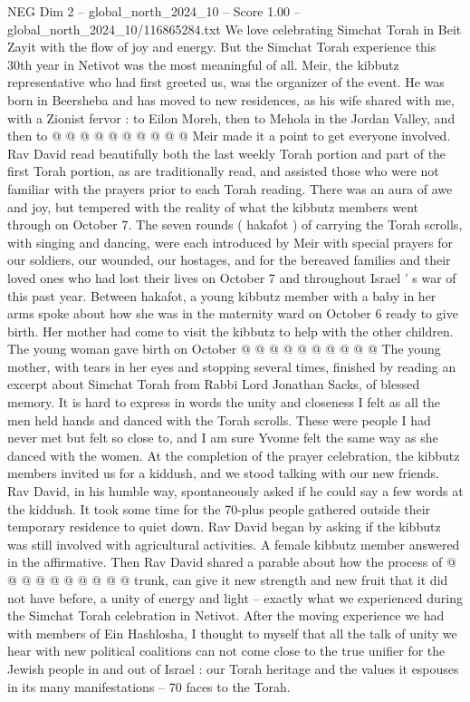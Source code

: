 \begin{textsample}{NEG Dim 2 – global\_north\_2024\_10 – Score 1.00 – global\_north\_2024\_10/116865284.txt}
We love celebrating Simchat Torah in Beit Zayit with the flow of joy and energy.
But the Simchat Torah experience this 30th year in Netivot was the most meaningful of all.
Meir, the kibbutz representative who had first greeted us, was the organizer of the event.
He was born in Beersheba and has moved to new residences, as his wife shared with me, with a Zionist fervor : to Eilon Moreh, then to Mehola in the Jordan Valley, and then to @ @ @ @ @ @ @ @ @ @ Meir made it a point to get everyone involved.
Rav David read beautifully both the last weekly Torah portion and part of the first Torah portion, as are traditionally read, and assisted those who were not familiar with the prayers prior to each Torah reading.
There was an aura of awe and joy, but tempered with the reality of what the kibbutz members went through on October 7.
The seven rounds ( hakafot ) of carrying the Torah scrolls, with singing and dancing, were each introduced by Meir with special prayers for our soldiers, our wounded, our hostages, and for the bereaved families and their loved ones who had lost their lives on October 7 and throughout Israel ' s war of this past year.
Between hakafot, a young kibbutz member with a baby in her arms spoke about how she was in the maternity ward on October 6 ready to give birth.
Her mother had come to visit the kibbutz to help with the other children.
The young woman gave birth on October @ @ @ @ @ @ @ @ @ @ The young mother, with tears in her eyes and stopping several times, finished by reading an excerpt about Simchat Torah from Rabbi Lord Jonathan Sacks, of blessed memory.
It is hard to express in words the unity and closeness I felt as all the men held hands and danced with the Torah scrolls.
These were people I had never met but felt so close to, and I am sure Yvonne felt the same way as she danced with the women.
At the completion of the prayer celebration, the kibbutz members invited us for a kiddush, and we stood talking with our new friends.
Rav David, in his humble way, spontaneously asked if he could say a few words at the kiddush.
It took some time for the 70-plus people gathered outside their temporary residence to quiet down.
Rav David began by asking if the kibbutz was still involved with agricultural activities.
A female kibbutz member answered in the affirmative.
Then Rav David shared a parable about how the process of @ @ @ @ @ @ @ @ @ @ trunk, can give it new strength and new fruit that it did not have before, a unity of energy and light -- exactly what we experienced during the Simchat Torah celebration in Netivot.
After the moving experience we had with members of Ein Hashlosha, I thought to myself that all the talk of unity we hear with new political coalitions can not come close to the true unifier for the Jewish people in and out of Israel : our Torah heritage and the values it espouses in its many manifestations -- 70 faces to the Torah.

\end{textsample}
